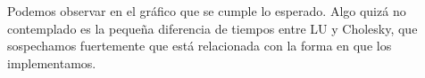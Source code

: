 Podemos observar en el gráfico que se cumple lo esperado. Algo quizá no contemplado es la pequeña diferencia de tiempos entre LU y Cholesky, que sospechamos fuertemente que está relacionada con la forma en que los implementamos.






